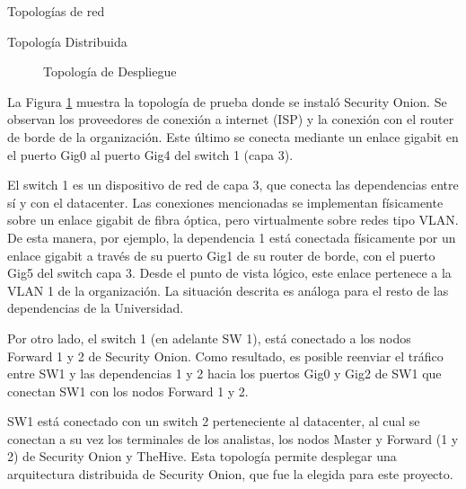 \begin{section}{Topologías de red }
\begin{subsection} {Topología Distribuida}
\begin{figure}[H]
                \caption{Topología de Despliegue}
                \label{fig:topologia_despliegue_proyecto}
            \end{figure}
            \FloatBarrier
             La Figura \ref{fig:topologia_despliegue_proyecto} muestra la topología de prueba donde se instaló Security Onion. Se observan los proveedores de conexión a internet (ISP) y la conexión con el router de borde de la organización. Este último se conecta mediante un enlace gigabit en el puerto Gig0 al puerto Gig4 del switch 1 (capa 3). \par
             El switch 1 es un dispositivo de red de capa 3, que conecta las dependencias entre sí y con el datacenter. Las conexiones mencionadas se implementan físicamente sobre un enlace gigabit de fibra óptica, pero virtualmente sobre redes tipo VLAN. De esta manera, por ejemplo, la dependencia 1 está conectada físicamente por un enlace gigabit a través de su puerto Gig1 de su router de borde, con el puerto Gig5 del switch capa 3. Desde el punto de vista lógico, este enlace pertenece a la VLAN 1 de la organización. La situación descrita es análoga para el resto de las dependencias de la Universidad.\par
            Por otro lado, el switch 1 (en adelante SW 1), está conectado a los nodos Forward 1 y 2 de Security Onion. Como resultado, es posible reenviar el tráfico entre SW1 y las dependencias 1 y 2 hacia los puertos Gig0 y Gig2 de SW1 que conectan SW1 con los nodos Forward 1 y 2. \par
            SW1 está conectado con un switch 2 perteneciente al datacenter, al cual se conectan a su vez los terminales de los analistas, los nodos Master y Forward (1 y 2) de Security Onion y TheHive. Esta topología permite desplegar una arquitectura distribuida de Security Onion, que fue la elegida para este proyecto. 
        \end{subsection}

   \end{section}
    \pagebreak

